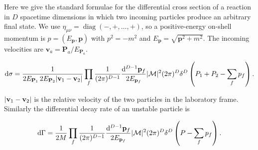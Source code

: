 
Here we give the standard formulae for the differential cross section of a reaction in
$D$ spacetime dimensions in which two incoming particles produce an arbitrary final
state.  We use $\eta_{\mu\nu}=\operatorname{diag}(-,+,\ldots,+)$, so a positive-energy
on-shell momentum is $p=(E_{\mathbf p},\mathbf p)$ with
$p^2=-m^2$ and $E_{\mathbf p}=\sqrt{\mathbf p^2+m^2}$.  The incoming velocities are
$\mathbf v_a=\mathbf P_a/E_{\mathbf P_a}$.

\[
\mathop{}\!\mathrm{d}\sigma=\frac{1}{2E_{\mathbf P_1}\,2E_{\mathbf P_2}
\lvert\mathbf v_1-\mathbf v_2\rvert}
\prod_f\frac{1}{(2\pi)^{D-1}}\frac{\mathop{}\!\mathrm{d}^{D-1}\mathbf p_f}{2E_{\mathbf p_f}}
\lvert\mathcal M\rvert^2(2\pi)^D
\delta^D\left(P_1+P_2-\sum_f p_f\right).
\]

 $\lvert\mathbf v_1-\mathbf v_2\rvert$ is the relative velocity of the two particles in the laboratory frame. Similarly
the differential decay rate of an unstable particle is

\[
\mathop{}\!\mathrm{d}\Gamma=\frac{1}{2M}\prod_f\frac{1}{(2\pi)^{D-1}}\frac{\mathop{}\!\mathrm{d}^{D-1}\mathbf p_f}{2E_{\mathbf p_f}}
\lvert\mathcal M\rvert^2(2\pi)^D
\delta^D\left(P-\sum_f p_f\right).
\]
